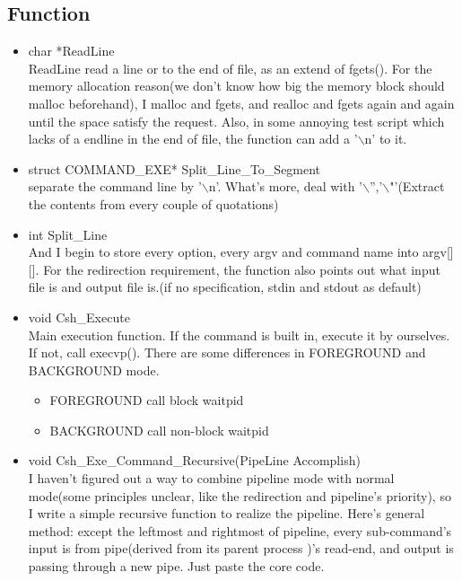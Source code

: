 \documentclass{article}
\begin{document}
	\subsection{Function}
			\begin{itemize}
				\item char *ReadLine	\\
					ReadLine read a line or to the end of file, as an extend of fgets().
					For the memory allocation reason(we don't know how big the memory block should malloc beforehand), I malloc and fgets, and realloc and fgets again and again until the space satisfy the request. Also, in some annoying test script which lacks of a endline in the end of file, the function can add a '$\backslash$n' to it.
				\item struct COMMAND\_EXE* Split\_Line\_To\_Segment	\\
					separate the command line by '$\backslash$n'. What's more, deal with '$\backslash$'','$\backslash$"'(Extract the contents from every couple of quotations)
				\item int  Split\_Line	\\
					And I begin to store every option, every argv and command name into argv[][]. For the redirection requirement, the function also points out what input file is and output file is.(if no specification, stdin and stdout as default)
				\item void Csh\_Execute	\\
					Main execution function. If the command is built in, execute it by ourselves. If not, call execvp(). There are some differences in FOREGROUND and BACKGROUND mode. 
					\begin{itemize}
						\item FOREGROUND
						call block waitpid
						\item BACKGROUND
						call non-block waitpid
					\end{itemize}
                \item void Csh\_Exe\_Command\_Recursive(PipeLine Accomplish) \\
					I haven't figured out a way to combine pipeline mode with normal mode(some principles unclear, like the redirection and pipeline's priority), so I write a simple recursive function to realize the pipeline. Here's general method: except the leftmost and rightmost of pipeline, every sub-command's input is from pipe(derived from its parent process )'s read-end, and output is passing through a new pipe. Just paste the core code.
				\begin{lstlisting}

\end{lstlisting}
\end{itemize}
\end{document}
